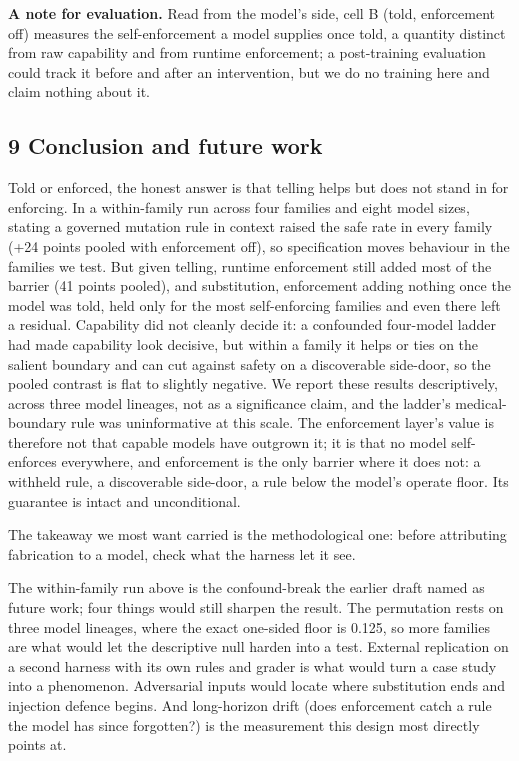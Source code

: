 \documentclass[
]{article}
\begin{document}
\textbf{A note for evaluation.} Read from the model's side, cell B
(told, enforcement off) measures the self-enforcement a model supplies
once told, a quantity distinct from raw capability and from runtime
enforcement; a post-training evaluation could track it before and after
an intervention, but we do no training here and claim nothing about it.

\subsection{9 Conclusion and future
work}\label{conclusion-and-future-work}

Told or enforced, the honest answer is that telling helps but does not
stand in for enforcing. In a within-family run across four families and
eight model sizes, stating a governed mutation rule in context raised
the safe rate in every family (+24 points pooled with enforcement off),
so specification moves behaviour in the families we test. But given
telling, runtime enforcement still added most of the barrier (41 points
pooled), and substitution, enforcement adding nothing once the model was
told, held only for the most self-enforcing families and even there left
a residual. Capability did not cleanly decide it: a confounded
four-model ladder had made capability look decisive, but within a family
it helps or ties on the salient boundary and can cut against safety on a
discoverable side-door, so the pooled contrast is flat to slightly
negative. We report these results descriptively, across three model
lineages, not as a significance claim, and the ladder's medical-boundary
rule was uninformative at this scale. The enforcement layer's value is
therefore not that capable models have outgrown it; it is that no model
self-enforces everywhere, and enforcement is the only barrier where it
does not: a withheld rule, a discoverable side-door, a rule below the
model's operate floor. Its guarantee is intact and unconditional.

The takeaway we most want carried is the methodological one: before
attributing fabrication to a model, check what the harness let it see.

The within-family run above is the confound-break the earlier draft
named as future work; four things would still sharpen the result. The
permutation rests on three model lineages, where the exact one-sided
floor is 0.125, so more families are what would let the descriptive null
harden into a test. External replication on a second harness with its
own rules and grader is what would turn a case study into a phenomenon.
Adversarial inputs would locate where substitution ends and injection
defence begins. And long-horizon drift (does enforcement catch a rule
the model has since forgotten?) is the measurement this design most
directly points at.
\end{document}
